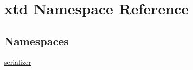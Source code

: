 \hypertarget{namespacextd}{\section{xtd Namespace Reference}
\label{namespacextd}
}
\subsection*{Namespaces}
\begin{DoxyCompactItemize}
\item 
\hyperlink{namespacextd_1_1serializer}{serializer}
\end{DoxyCompactItemize}
